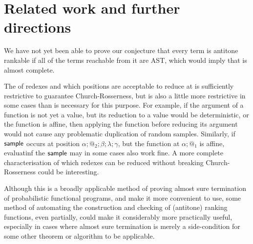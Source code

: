 \section{Related work and further directions}





\label{sec:related}
We have not yet been able to prove our conjecture that every term is antitone rankable if all of the terms reachable from it are AST, which would imply that  is almost complete.

The  of redexes and which positions are acceptable to reduce at is sufficiently restrictive to guarantee Church-Rosserness, but is also a little more restrictive in some cases than is necessary for this purpose. For example, if the argument of a function is not yet a value, but its reduction to a value would be deterministic, or the function is affine, then applying the function before reducing its argument would not cause any problematic duplication of random samples. Similarly, if $\mathsf{sample}$ occurs at position $\alpha;@_2;\beta;\lambda;\gamma$, but the function at $\alpha;@_1$ is affine, evaluatinf the $\mathsf{sample}$ may in some cases also work fine. A more complete characterisation of which redexes can be reduced without breaking Church-Rosserness could be interesting.

Although this is a broadly applicable method of proving almost sure termination of probabilistic functional programs, and  make it more convenient to use, some method of automating the construction and checking of (antitone) ranking functions, even partially, could make it considerably more practically useful, especially in cases where almost sure termination is merely a side-condition for some other theorem or algorithm to be applicable.
